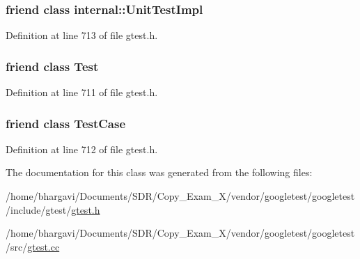 \subsubsection[{\texorpdfstring{internal\+::\+Unit\+Test\+Impl}{internal::UnitTestImpl}}]{\setlength{\rightskip}{0pt plus 5cm}friend class {\bf internal\+::\+Unit\+Test\+Impl}\hspace{0.3cm}{\ttfamily [friend]}}\hypertarget{classtesting_1_1_test_info_acc0a5e7573fd6ae7ad1878613bb86853}{}\label{classtesting_1_1_test_info_acc0a5e7573fd6ae7ad1878613bb86853}


Definition at line 713 of file gtest.\+h.

\subsubsection[{\texorpdfstring{Test}{Test}}]{\setlength{\rightskip}{0pt plus 5cm}friend class {\bf Test}\hspace{0.3cm}{\ttfamily [friend]}}\hypertarget{classtesting_1_1_test_info_a5b78b1c2e1fa07ffed92da365593eaa4}{}\label{classtesting_1_1_test_info_a5b78b1c2e1fa07ffed92da365593eaa4}


Definition at line 711 of file gtest.\+h.

\subsubsection[{\texorpdfstring{Test\+Case}{TestCase}}]{\setlength{\rightskip}{0pt plus 5cm}friend class {\bf Test\+Case}\hspace{0.3cm}{\ttfamily [friend]}}\hypertarget{classtesting_1_1_test_info_aff779e55b06adfa7c0088bd10253f0f0}{}\label{classtesting_1_1_test_info_aff779e55b06adfa7c0088bd10253f0f0}


Definition at line 712 of file gtest.\+h.



The documentation for this class was generated from the following files\+:\begin{DoxyCompactItemize}
\item 
/home/bhargavi/\+Documents/\+S\+D\+R/\+Copy\+\_\+\+Exam\+\_\+X/vendor/googletest/googletest/include/gtest/\hyperlink{gtest_8h}{gtest.\+h}\item 
/home/bhargavi/\+Documents/\+S\+D\+R/\+Copy\+\_\+\+Exam\+\_\+X/vendor/googletest/googletest/src/\hyperlink{gtest_8cc}{gtest.\+cc}\end{DoxyCompactItemize}
